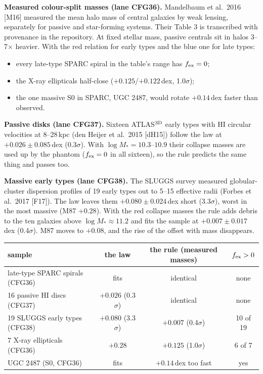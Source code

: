 \documentclass[10pt]{article}
\begin{document}
\textbf{Measured colour-split masses (lane CFG36).} Mandelbaum et al.\ 2016 [M16] measured the mean halo mass of central galaxies by weak lensing, separately for passive and star-forming systems. Their Table 3 is transcribed with provenance in the repository. At fixed stellar mass, passive centrals sit in halos 3--7$\times$ heavier. With the red relation for early types and the blue one for late types:
\begin{itemize}
\item every late-type SPARC spiral in the table's range has $f_{\rm ex}=0$;
\item the X-ray ellipticals half-close ($+0.125$/$+0.122$\,dex, 1.0$\sigma$);
\item the one massive S0 in SPARC, UGC 2487, would rotate $+0.14$\,dex faster than observed.
\end{itemize}

\textbf{Passive disks (lane CFG37).} Sixteen ATLAS$^{\rm 3D}$ early types with HI circular velocities at 8--28\,kpc (den Heijer et al.\ 2015 [dH15]) follow the law at $+0.026\pm0.085$\,dex (0.3$\sigma$). With $\log M_*=10.3$--$10.9$ their collapse masses are used up by the phantom ($f_{\rm ex}=0$ in all sixteen), so the rule predicts the same thing and passes too.

\textbf{Massive early types (lane CFG38).} The SLUGGS survey measured globular-cluster dispersion profiles of 19 early types out to 5--15 effective radii (Forbes et al.\ 2017 [F17]). The law leaves them $+0.080\pm0.024$\,dex short (3.3$\sigma$), worst in the most massive (M87 $+0.28$). With the red collapse masses the rule adds debris to the ten galaxies above $\log M_*\approx11.2$ and fits the sample at $+0.007\pm0.017$\,dex (0.4$\sigma$). M87 moves to $+0.08$, and the rise of the offset with mass disappears.

\begin{center}
\begin{tabular}{lccc}
\toprule
sample & the law & the rule (measured masses) & $f_{\rm ex}>0$ \\
\midrule
late-type SPARC spirals (CFG36) & fits & identical & none \\
16 passive HI discs (CFG37) & $+0.026$ (0.3$\sigma$) & identical & none \\
19 SLUGGS early types (CFG38) & $+0.080$ (3.3$\sigma$) & $+0.007$ (0.4$\sigma$) & 10 of 19 \\
7 X-ray ellipticals (CFG36) & $+0.28$ & $+0.125$ (1.0$\sigma$) & 6 of 7 \\
UGC 2487 (S0, CFG36) & fits & $+0.14$\,dex too fast & yes \\
\bottomrule
\end{tabular}
\end{center}
\end{document}
